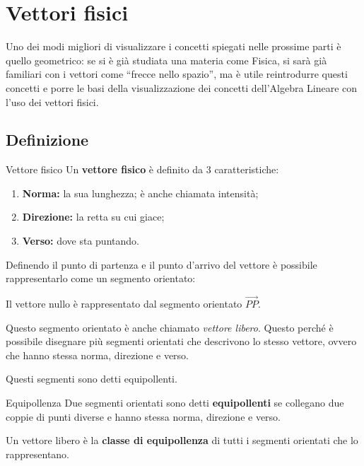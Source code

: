 \chapter{Vettori fisici}
Uno dei modi migliori di visualizzare i concetti spiegati nelle prossime parti è quello geometrico: se si è già studiata una materia come Fisica, si sarà già familiari con i vettori come ``frecce nello spazio'', ma è utile reintrodurre questi concetti e porre le basi della visualizzazione dei concetti dell'Algebra Lineare con l'uso dei vettori fisici.

\section{Definizione}
\begin{newdef}{Vettore fisico}
    Un \textbf{vettore fisico} è definito da 3 caratteristiche:
    \begin{enumerate}
        \item \textbf{Norma:} la sua lunghezza; è anche chiamata intensità;
        \item \textbf{Direzione:} la retta su cui giace;
        \item \textbf{Verso:} dove sta puntando.
    \end{enumerate}
\end{newdef}

Definendo il punto di partenza e il punto d'arrivo del vettore è possibile rappresentarlo come un segmento orientato:
\begin{center}
    \tikzset{external/export = true}
    \tikzset{external/export = false}
\end{center}
\begin{nb}
    Il vettore nullo è rappresentato dal segmento orientato $\vec{PP}$.
\end{nb}
Questo segmento orientato è anche chiamato \textit{vettore libero}. Questo perché è possibile disegnare più segmenti orientati che descrivono lo stesso vettore, ovvero che hanno stessa norma, direzione e verso.
\begin{center}
    \tikzset{external/export = true}
    \tikzset{external/export = false}
\end{center}
Questi segmenti sono detti equipollenti.
\begin{newdef}{Equipollenza}
    Due segmenti orientati sono detti \textbf{equipollenti} se collegano due coppie di punti diverse e hanno stessa norma, direzione e verso.

    Un vettore libero è la \textbf{classe di equipollenza} di tutti i segmenti orientati che lo rappresentano.
\end{newdef}

